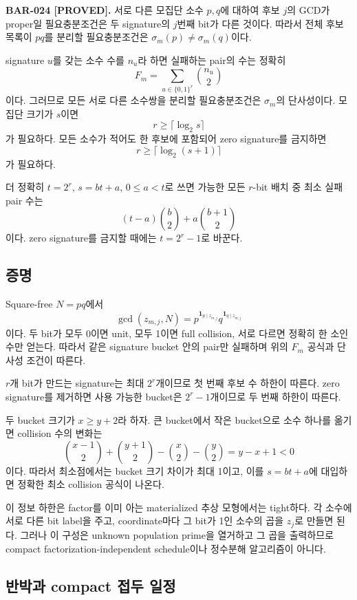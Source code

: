 \documentclass[11pt]{article}
\begin{document}
\textbf{BAR-024 [PROVED].}
서로 다른 모집단 소수 \(p,q\)에 대하여 후보 \(j\)의 GCD가 proper일
필요충분조건은 두 signature의 \(j\)번째 bit가 다른 것이다. 따라서
전체 후보 목록이 \(pq\)를 분리할 필요충분조건은
\(\sigma_m(p)\ne\sigma_m(q)\)이다.

signature \(u\)를 갖는 소수 수를 \(n_u\)라 하면 실패하는 pair의 수는
정확히
\[
F_m=\sum_{u\in\{0,1\}^r}\binom{n_u}{2}
\]
이다. 그러므로 모든 서로 다른 소수쌍을 분리할 필요충분조건은
\(\sigma_m\)의 단사성이다. 모집단 크기가 \(s\)이면
\[
r\ge\lceil\log_2s\rceil
\]
가 필요하다. 모든 소수가 적어도 한 후보에 포함되어 zero signature를
금지하면
\[
r\ge\lceil\log_2(s+1)\rceil
\]
가 필요하다.

더 정확히 \(t=2^r\), \(s=bt+a\), \(0\le a<t\)로 쓰면 가능한 모든
\(r\)-bit 배치 중 최소 실패 pair 수는
\[
(t-a)\binom b2+a\binom{b+1}{2}
\]
이다. zero signature를 금지할 때에는 \(t=2^r-1\)로 바꾼다.

\subsection{증명}

Square-free \(N=pq\)에서
\[
\gcd(z_{m,j},N)
=p^{\mathbf1_{p\mid z_{m,j}}}
 q^{\mathbf1_{q\mid z_{m,j}}}
\]
이다. 두 bit가 모두 0이면 unit, 모두 1이면 full collision, 서로
다르면 정확히 한 소인수만 얻는다. 따라서 같은 signature bucket
안의 pair만 실패하며 위의 \(F_m\) 공식과 단사성 조건이 따른다.

\(r\)개 bit가 만드는 signature는 최대 \(2^r\)개이므로 첫 번째 후보
수 하한이 따른다. zero signature를 제거하면 사용 가능한 bucket은
\(2^r-1\)개이므로 두 번째 하한이 따른다.

두 bucket 크기가 \(x\ge y+2\)라 하자. 큰 bucket에서 작은 bucket으로
소수 하나를 옮기면 collision 수의 변화는
\[
\binom{x-1}{2}+\binom{y+1}{2}
-\binom x2-\binom y2=y-x+1<0
\]
이다. 따라서 최소점에서는 bucket 크기 차이가 최대 1이고, 이를
\(s=bt+a\)에 대입하면 정확한 최소 collision 공식이 나온다.

이 정보 하한은 factor를 이미 아는 materialized 추상 모형에서는
tight하다. 각 소수에 서로 다른 bit label을 주고, coordinate마다
그 bit가 1인 소수의 곱을 \(z_j\)로 만들면 된다. 그러나 이 구성은
unknown population prime을 열거하고 그 곱을 출력하므로 compact
factorization-independent schedule이나 정수분해 알고리즘이 아니다.

\subsection{반박과 compact 접두 일정}
\end{document}
